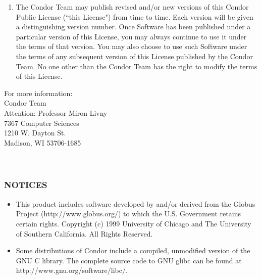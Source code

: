 \begin{enumerate}
\item The Condor Team may publish revised and/or new versions of this
   Condor Public License (``this License") from time to time.  Each
   version will be given a distinguishing version number.  Once
   Software has been published under a particular version of this
   License, you may always continue to use it under the terms of that
   version. You may also choose to use such Software under the terms
   of any subsequent version of this License published by the Condor
   Team.  No one other than the Condor Team has the right to modify
   the terms of this License. 

\end{enumerate}


\begin{flushleft}
For more information: \\

Condor Team \\
Attention: Professor Miron Livny \\
7367 Computer Sciences \\ 
1210 W. Dayton St. \\
Madison, WI 53706-1685 \\
 \\
 \\
\end{flushleft}

\subsubsection*{\label{sec:notices}NOTICES}
\begin{itemize}
\item  This product includes software developed by and/or derived from the
Globus Project (http://www.globus.org/) to which the U.S. Government
retains certain rights.  Copyright (c) 1999 University of Chicago and
The University of Southern California. All Rights Reserved.

\item  Some distributions of Condor include a compiled, unmodified version
of the GNU C library. The complete source code to GNU glibc can be
found at http://www.gnu.org/software/libc/.
\end{itemize}
